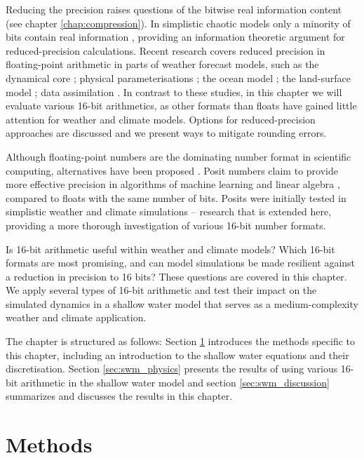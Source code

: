 Reducing the precision raises questions of the bitwise real information content (see chapter \ref{chap:compression}). In simplistic chaotic
models only a minority of bits contain real information \citep{Jeffress2017}, providing an information theoretic argument for reduced-precision
calculations. Recent research covers reduced precision in floating-point arithmetic in parts of weather forecast models,
such as the dynamical core \citep{Duben2014,Thornes2017,Chantry2019,Hatfield2020}; physical parameterisations \citep{Saffin2020};
the ocean model \citep{TintoPrims2019}; the land-surface model \citep{Dawson2018}; data assimilation \citep{Hatfield2017,Hatfield2018}.
In contrast to these studies, in this chapter we will evaluate various 16-bit arithmetics, as other formats than floats have gained little
attention for weather and climate models. Options for reduced-precision approaches are discussed and we present ways to mitigate rounding errors.

Although floating-point numbers are the dominating number format in scientific computing, alternatives have been proposed
\citep{Gustafson2017a}. Posit numbers claim to provide more effective precision in algorithms of machine learning
and linear algebra \citep{Gustafson2017a,Langroudi2019,Chen2018}, compared to floats with the same number of bits.
Posits were initially tested in simplistic weather and climate simulations \citep{Klower2019a} -- research that is extended
here, providing a more thorough investigation of various 16-bit number formats.

Is 16-bit arithmetic useful within weather and climate models? Which 16-bit formats are most promising, and can model
simulations be made resilient against a reduction in precision to 16 bits? These questions are covered in this chapter.
We apply several types of 16-bit arithmetic and test their impact on the simulated dynamics in a shallow water model that
serves as a medium-complexity weather and climate application.

The chapter is structured as follows: Section \ref{sec:swm_methods} introduces the methods specific to this chapter, including
an introduction to the shallow water equations and their discretisation. Section \ref{sec:swm_physics} presents the results of
using various 16-bit arithmetic in the shallow water model and section \ref{sec:swm_discussion} summarizes and discusses
the results in this chapter.

\section{Methods}
\label{sec:swm_methods}

